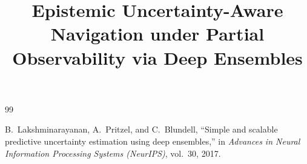 \documentclass[letterpaper, 10pt, conference]{IEEEtran}
\begin{document}
\title{Epistemic Uncertainty-Aware Navigation under Partial Observability via Deep Ensembles}

\author{
}

\begin{thebibliography}{99}

B.~Lakshminarayanan, A.~Pritzel, and C.~Blundell,
``Simple and scalable predictive uncertainty estimation using deep ensembles,''
in \textit{Advances in Neural Information Processing Systems (NeurIPS)}, vol.~30, 2017.

\end{thebibliography}
\end{document}

